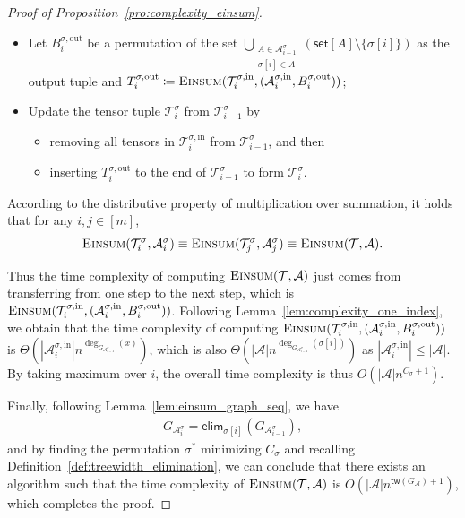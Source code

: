 \documentclass[twoside,11pt]{article}
\newcommand{\takesetp}[1]{\mathsf{set}[#1]}
\newcommand{\tensorcontraction}{\textsc{Einsum}}
\newcommand{\degp}[2]{\deg_{#2}(#1)}
\newcommand{\treewidthp}[1]{\mathsf{tw}(#1)}
\newcommand{\graphform}[1]{G_{#1}}
\newcommand{\less}{O}
\newcommand{\appequal}{\Theta}
\newcommand{\eliminatevg}[2]{\mathsf{elim}_{#1}(#2)}
\def\calA{\mathcal{A}}
\def\calT{\mathcal{T}}
\begin{document}
\begin{proof}[Proof of Proposition~\ref{pro:complexity_einsum}]
\begin{itemize}
    \item Let $B^{\sigma, \mathrm{out}}_i$ be a permutation of the set $\bigcup_{\substack{A \in \calA^{\sigma}_{i-1} \\ \sigma[i] \in A}} (\takesetp{A} \setminus \{\sigma[i]\})$ as the output tuple and $T^{\sigma, \mathrm{out}}_i \coloneqq \tensorcontraction(\calT^{\sigma, \mathrm{in}}_i, (\calA^{\sigma, \mathrm{in}}_i, B^{\sigma, \mathrm{out}}_i))$;
    
    \item Update the tensor tuple $\calT^{\sigma}_i$ from $\calT^{\sigma}_{i-1}$ by
    \begin{itemize}
        \item removing all tensors in $\calT^{\sigma, \mathrm{in}}_i$ from $\calT^{\sigma}_{i-1}$, and then
        \item inserting $T^{\sigma, \mathrm{out}}_i$ to the end of $\calT^{\sigma}_{i-1}$ to form $\calT^{\sigma}_{i}$.
    \end{itemize}
\end{itemize}

According to the distributive property of multiplication over summation, it holds that for any $i,j \in [m]$, 
\begin{align*}
\tensorcontraction(\calT^\sigma_i, \calA^\sigma_i) \equiv  \tensorcontraction(\calT^\sigma_j, \calA^\sigma_j) \equiv \tensorcontraction(\calT, \calA).
\end{align*}

Thus the time complexity of computing $\tensorcontraction(\calT, \calA)$ just comes from transferring from one step to the next step, which is $\tensorcontraction(\calT^{\sigma, \mathrm{in}}_i, (\calA^{\sigma, \mathrm{in}}_i, B^{\sigma, \mathrm{out}}_i))$. Following Lemma~\ref{lem:complexity_one_index}, we obtain that the time complexity of computing $\tensorcontraction(\calT^{\sigma, \mathrm{in}}_i, (\calA^{\sigma, \mathrm{in}}_i, B^{\sigma, \mathrm{out}}_i))$ is \linebreak$\appequal(|\calA^{\sigma, \mathrm{in}}_i| n^{\degp{x}{\graphform{\calA^{\sigma}_{i-1}}}})$, which is also $\appequal(|\calA|n^{\degp{\sigma[i]}{\graphform{\calA^{\sigma}_{i-1}}}})$ as $|\calA^{\sigma, \mathrm{in}}_i| \leq |\calA|$. By taking maximum over $i$, the overall time complexity is thus $\less(|\calA|n^{C_\sigma + 1})$.

Finally, following Lemma~\ref{lem:einsum_graph_seq}, we have
\begin{align*}
\graphform{\calA^{\sigma}_i} = \eliminatevg{\sigma[i]}{\graphform{\calA^{\sigma}_{i-1}}},
\end{align*}
and by finding the permutation $\sigma^{\ast}$ minimizing $ C_{\sigma}$ and recalling Definition~\ref{def:treewidth_elimination}, we can conclude that there exists an algorithm such that the time complexity of $\tensorcontraction(\calT, \calA)$ is $\less(|\calA|n^{\treewidthp{G_\calA}+1})$, which completes the proof. 
\end{proof}
\end{document}
